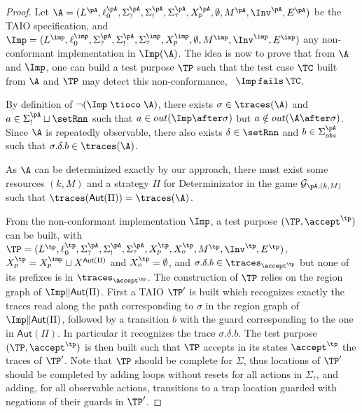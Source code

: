\documentclass{LMCS}
\theoremstyle{plain}\newtheorem{proposition}[thm]{Proposition}
\begin{document}
\begin{proof}
  Let
  $\A=(L^\pA,\ell_0^\pA,\Sigma_?^\pA,\Sigma_!^\pA,\Sigma_\tau^\pA,X_p^\pA,\emptyset,M^\pA,\Inv^\pA,E^\pA)$
  be the TAIO specification, and
  $\Imp=(L^\imp,\ell_0^\imp,\Sigma_?^{\pA},\Sigma_!^{\pA},\Sigma_\tau^\imp,X_p^\imp,\emptyset,M^\imp,\Inv^\imp,E^\imp)$
  any non-conformant implementation in $\Imp(\A)$.  The idea is
  now to prove that from $\A$ and $\Imp$, one can build a test purpose
  $\TP$ such that the test case $\TC$ built from $\A$ and $\TP$ may
  detect this non-conformance, \ie~$\Imp\, {\tt fails} \, \TC $.

  By definition of $\neg(\Imp \;\tioco\; \A)$, there exists $\sigma
  \in \traces(\A)$ and $a \in \Sigma_!^\pA \sqcup \setRnn$ such that
  $a \in out(\Imp \after \sigma)$ but $a \notin out(\A \after
  \sigma)$.  Since $\A$ is repeatedly observable, there also exists
  $\delta \in \setRnn$ and $b \in \Sigma_{obs}^\pA$ such that
  $\sigma.\delta.b \in \traces(\A)$.

  As $\A$ can be determinized exactly by our approach, there must
  exist some resources $(k,M)$ and a strategy $\Pi$ for
  Determinizator in the game $\mathcal{G}_{\pA,(k,M)}$ such that
  $\traces(\mathsf{Aut}(\Pi)) = \traces(\A)$.



  From the non-conformant implementation $\Imp$, a test purpose
  $(\TP,\accept^\tp)$ can be built, with $\TP=
  (L^\tp,\ell_0^\tp,\Sigma_?^{\pA},\Sigma_!^{\pA},\Sigma_\tau ^{\pA},
  X_p^\tp,X_o^\tp,M^\tp,\Inv^\tp,E^\tp)$, $X_p^\tp= X_p^\imp\sqcup
  X^{\mathsf{Aut}(\Pi)}$ and $X_o^\tp=\emptyset$, and
  $\sigma.\delta.b \in \traces_{\accept^\tp}$ but none of its prefixes
  is in $\traces_{\accept^\tp}$.  The construction of $\TP$ relies on
  the region graph of $\Imp\|\mathsf{Aut}(\Pi)$.  First a TAIO $\TP'$
  is built which recognizes exactly the traces read along the path
  corresponding to $\sigma$ in the region graph of
  $\Imp\|\mathsf{Aut}(\Pi)$, followed by a transition $b$ with the
  guard corresponding to the one in $\mathsf{Aut}(\Pi)$.  In
  particular it recognizes the trace $\sigma.\delta.b$.  The test
  purpose $(\TP,\accept^\tp)$ is then built such that $\TP$ accepts in
  its states $\accept^\tp$ the traces of $\TP'$.  Note that $\TP$
  should be complete for $\Sigma$, thus locations of $\TP'$ should be
  completed by adding loops without resets for all actions in
  $\Sigma_\tau$, and adding, for all observable actions, transitions
  to a trap location guarded with negations of their guards in $\TP'$.


\end{proof}
\end{document}
